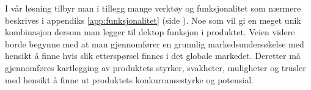 I vår løsning tilbyr man i tillegg mange verktøy og funksjonalitet som nærmere beskrives i appendiks \ref{app:funksjonalitet} (side \pageref{app:funksjonalitet}). 
Noe som vil gi en meget unik kombinasjon dersom man legger til dektop funksjon i produktet.
Veien videre borde begynne med at man gjennomfører en grunnlig markedsundersøkelse med hensikt å finne hvis slik etterspørsel finnes i det globale markedet. 
Deretter må gjennomføres kartlegging av produktets styrker, svakheter, muligheter og trusler med hensikt å finne ut produktets konkurransestyrke og potensial.